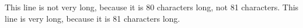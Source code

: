 This line is not very long, because it is 80 characters long, not 81 characters.
This line is very long, because it is 81 characters long.  %
